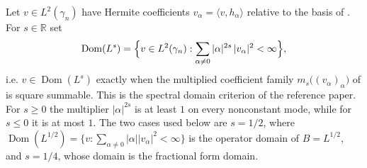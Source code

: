 \begin{definition}
Let $v \in L^2(\gamma_n)$ have Hermite coefficients
$v_\alpha = \langle v, h_\alpha\rangle$ relative to the basis of
.  For $s \in \mathbb{R}$ set
\[
  \operatorname{Dom}(L^s)
    = \Bigl\{ v \in L^2(\gamma_n) :
        \sum_{\alpha \neq 0} |\alpha|^{2s}\,|v_\alpha|^2 < \infty \Bigr\},
\]
i.e. $v \in \operatorname{Dom}(L^s)$ exactly when the multiplied coefficient family
$m_s\bigl((v_\alpha)_\alpha\bigr)$ of  is square summable.
This is the spectral domain criterion of the reference paper.  For $s \geq 0$ the
multiplier $|\alpha|^{2s}$ is at least $1$ on every nonconstant mode, while for
$s \leq 0$ it is at most $1$.  The two cases used below are $s = 1/2$, where
$\operatorname{Dom}(L^{1/2}) = \{v : \sum_{\alpha\neq0}|\alpha||v_\alpha|^2<\infty\}$
is the operator domain of $B = L^{1/2}$, and $s = 1/4$, whose domain is the
fractional form domain.
\end{definition}
